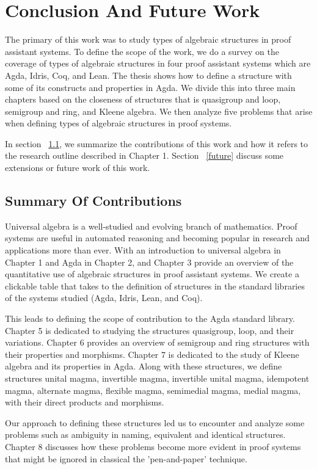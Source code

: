 \chapter{Conclusion And Future Work}
The primary of this work was to study types of algebraic structures in proof
assistant systems. To define the scope of the work, we do a survey on the
coverage of types of algebraic structures in four proof assistant systems which
are Agda, Idris, Coq, and Lean. The thesis shows how to define a structure with
some of its constructs and properties in Agda. We divide this into three main
chapters based on the closeness of structures that is quasigroup and loop,
semigroup and ring, and Kleene algebra. We then analyze five problems that arise
when defining types of algebraic structures in proof systems.

In section ~\ref{contribution}, we summarize the contributions of this work and
how it refers to the research outline described in Chapter 1. Section
~\ref{future} discuss some extensions or future work of this work. 

\section{Summary Of Contributions}
\label{contribution}
Universal algebra is a well-studied and evolving branch of mathematics. Proof
systems are useful in automated reasoning and becoming popular in research and
applications more than ever. With an introduction to universal algebra in
Chapter 1 and Agda in Chapter 2, and Chapter 3 provide an overview of the
quantitative use of algebraic structures in proof assistant systems. We create a
clickable table that takes to the definition of structures in the standard
libraries of the systems studied (Agda, Idris, Lean, and Coq).

This leads to defining the scope of contribution to the Agda standard library.
Chapter 5 is dedicated to studying the structures quasigroup, loop, and their
variations. Chapter 6 provides an overview of semigroup and ring structures with
their properties and morphisms. Chapter 7 is dedicated to the study of Kleene
algebra and its properties in Agda. Along with these structures, we define
structures unital magma, invertible magma, invertible unital magma, idempotent
magma, alternate magma, flexible magma, semimedial magma, medial magma, with
their direct products and morphisms.

Our approach to defining these structures led us to encounter and analyze some
problems such as ambiguity in naming, equivalent and identical structures.
Chapter 8 discusses how these problems become more evident in proof systems that
might be ignored in classical the 'pen-and-paper' technique.


